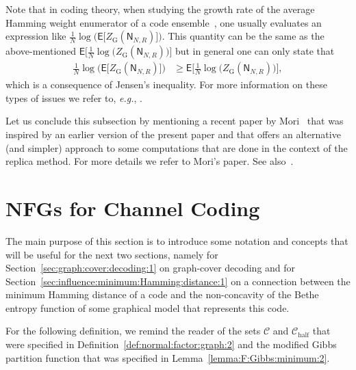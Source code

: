 \documentclass[journal, twocolumn]{IEEEtran}
\newcommand{\eg}{\emph{e.g.}}
\renewcommand{\geq}{\geqslant}
\newcommand{\Expec}{\mathsf{E}}
\newcommand{\code}[1]{\mathcal{#1}}
\newcommand{\graph}[1]{\mathsf{#1}}
\newcommand{\codeCedge}{\code{C}}
\newcommand{\codeCedgehalf}{\code{C}_{\mathrm{half}}}
\newcommand{\graphN}{\graph{N}}
\newcommand{\?}{\mathrm{?}}
\newcommand{\ZGibbsext}[1]{Z_{\mathrm{G}}(#1)}
\begin{document}
Note that in coding theory, when studying the growth rate of the average
Hamming weight enumerator of a code ensemble~\cite{Gallager:63}, one usually
evaluates an expression like $\frac{1}{N} \log \bigl( \Expec \bigl[
\ZGibbsext{\graphN_{N,R}} \bigr] \bigr)$. This quantity can be the same as the
above-mentioned $\Expec \bigl[ \frac{1}{N} \log \bigl(
\ZGibbsext{\graphN_{N,R}} \bigr) \bigr]$ but in general one can only state
that
\begin{align*}
     \frac{1}{N}
     \log
       \Big(
         \Expec
           \big[
             \ZGibbsext{\graphN_{N,R}}
           \big]
       \Big)
    &\geq
       \Expec
         \Big[
           \frac{1}{N}
           \log
             \big(
               \ZGibbsext{\graphN_{N,R}}
             \big)
         \Big],
\end{align*}
which is a consequence of Jensen's inequality. For more information on these
types of issues we refer to, \eg, \cite{Di:Montanari:Urbanke:04:1}.


Let us conclude this subsection by mentioning a recent paper by
Mori~\cite{Mori:11:1} that was inspired by an earlier version of the present
paper and that offers an alternative (and simpler) approach to some
computations that are done in the context of the replica method. For more
details we refer to Mori's paper. See also~\cite{Mori:Tanaka:12:1}.



\section{NFGs for Channel Coding}
\label{sec:normal:factor:graphs:for:channel:coding:1}


The main purpose of this section is to introduce some notation and concepts
that will be useful for the next two sections, namely for
Section~\ref{sec:graph:cover:decoding:1} on graph-cover decoding and for
Section~\ref{sec:influence:minimum:Hamming:distance:1} on a connection between
the minimum Hamming distance of a code and the non-concavity of the Bethe
entropy function of some graphical model that represents this code.


For the following definition, we remind the reader of the sets $\codeCedge$
and $\codeCedgehalf$ that were specified in
Definition~\ref{def:normal:factor:graph:2} and the modified Gibbs partition
function that was specified in Lemma~\ref{lemma:F:Gibbs:minimum:2}.
\end{document}
